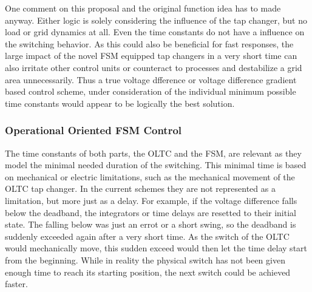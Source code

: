 
        One comment on this proposal and the original function idea has to made anyway.
        Either logic is solely considering the influence of the tap changer, but no load or grid dynamics at all.
        Even the time constants do not have a influence on the switching behavior.
        As this could also be beneficial for fast responses, the large impact of the novel \acs{FSM} equipped tap changers in a very short time can also irritate other control units or counteract to processes and destabilize a grid area unnecessarily.
        Thus a true voltage dfference or voltage difference gradient based control scheme, under consideration of the individual minimum possible time constants would appear to be logically the best solution.

\subsubsection{Operational Oriented FSM Control}
\label{sec:modeling-op-control}


The time constants of both parts, the \acs{OLTC} and the \acs{FSM}, are relevant as they model the minimal needed duration of the switching.
This minimal time is based on mechanical or electric limitations, such as the mechanical movement of the \acs{OLTC} tap changer.
In the current schemes they are not represented as a limitation, but more just as a delay.
For example, if the voltage difference falls below the deadband, the integrators or time delays are resetted to their initial state. 
The falling below was just an errot or a short swing, so the deadband is suddenly exceeded again after a very short time.
As the switch of the \acs{OLTC} would mechanically move, this sudden exceed would then let the time delay start from the beginning.
While in reality the physical switch has not been given enough time to reach its starting position, the next switch could be achieved faster. 

